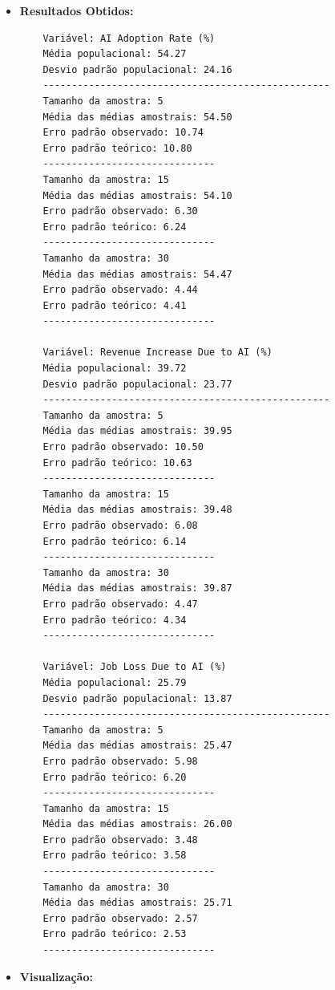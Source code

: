 \documentclass[12pt]{article}
\begin{document}
\begin{itemize}
    \item \textbf{Resultados Obtidos:}
    \begin{verbatim}
    Variável: AI Adoption Rate (%)
    Média populacional: 54.27
    Desvio padrão populacional: 24.16
    --------------------------------------------------
    Tamanho da amostra: 5
    Média das médias amostrais: 54.50
    Erro padrão observado: 10.74
    Erro padrão teórico: 10.80
    ------------------------------
    Tamanho da amostra: 15
    Média das médias amostrais: 54.10
    Erro padrão observado: 6.30
    Erro padrão teórico: 6.24
    ------------------------------
    Tamanho da amostra: 30
    Média das médias amostrais: 54.47
    Erro padrão observado: 4.44
    Erro padrão teórico: 4.41
    ------------------------------

    Variável: Revenue Increase Due to AI (%)
    Média populacional: 39.72
    Desvio padrão populacional: 23.77
    --------------------------------------------------
    Tamanho da amostra: 5
    Média das médias amostrais: 39.95
    Erro padrão observado: 10.50
    Erro padrão teórico: 10.63
    ------------------------------
    Tamanho da amostra: 15
    Média das médias amostrais: 39.48
    Erro padrão observado: 6.08
    Erro padrão teórico: 6.14
    ------------------------------
    Tamanho da amostra: 30
    Média das médias amostrais: 39.87
    Erro padrão observado: 4.47
    Erro padrão teórico: 4.34
    ------------------------------

    Variável: Job Loss Due to AI (%)
    Média populacional: 25.79
    Desvio padrão populacional: 13.87
    --------------------------------------------------
    Tamanho da amostra: 5
    Média das médias amostrais: 25.47
    Erro padrão observado: 5.98
    Erro padrão teórico: 6.20
    ------------------------------
    Tamanho da amostra: 15
    Média das médias amostrais: 26.00
    Erro padrão observado: 3.48
    Erro padrão teórico: 3.58
    ------------------------------
    Tamanho da amostra: 30
    Média das médias amostrais: 25.71
    Erro padrão observado: 2.57
    Erro padrão teórico: 2.53
    ------------------------------
    \end{verbatim}
    
    \newpage
    \item \textbf{Visualização:}
    

\end{itemize}
\end{document}

